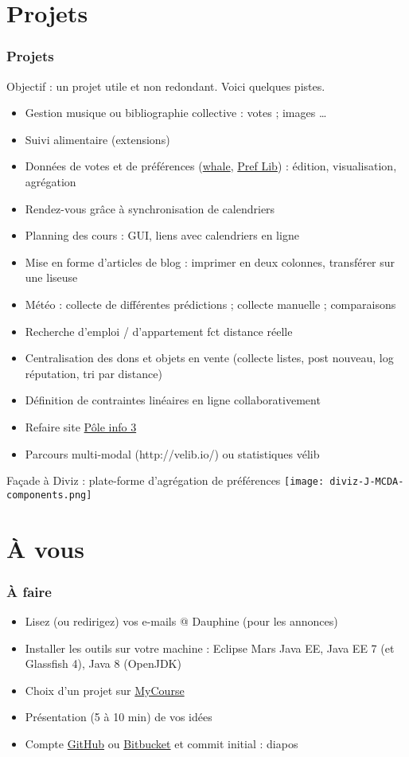 \documentclass[english, french]{beamer}
\begin{document}
\section{Projets}
\begin{frame}[allowframebreaks]
	\frametitle{Projets}
	Objectif : un projet utile et non redondant. Voici quelques pistes.
	\begin{itemize}
		\item Gestion musique ou bibliographie collective : votes ; images …
		\item Suivi alimentaire (extensions)
		\item Données de votes et de préférences ({\href{http://whale3.noiraudes.net/whale3/index.do}{whale}, \href{http://www.preflib.org/}{Pref Lib}}) : édition, visualisation, agrégation
		\item Rendez-vous grâce à synchronisation de calendriers
		\item Planning des cours : GUI, liens avec calendriers en ligne
		\item Mise en forme d’articles de blog : imprimer en deux colonnes, transférer sur une liseuse
		\item Météo : collecte de différentes prédictions ; collecte manuelle ; comparaisons
		\item Recherche d’emploi / d’appartement fct distance réelle
		\item Centralisation des dons et objets en vente (collecte listes, post nouveau, log réputation, tri par distance)
		\item Définition de contraintes linéaires en ligne collaborativement
		\item Refaire site \href{http://www.poleinfo3.dauphine.fr/}{Pôle info 3}
		\item Parcours multi-modal (http://velib.io/) ou statistiques vélib
	\end{itemize}
	Façade à Diviz : plate-forme d’agrégation de préférences
	\texttt{[image: diviz-J-MCDA-components.png]}
\end{frame}

\section{À vous}
\begin{frame}
	\frametitle{À faire}
	\begin{itemize}
		\item Lisez (ou redirigez) vos e-mails @ Dauphine (pour les annonces)
		\item Installer les outils sur votre machine : Eclipse Mars Java EE, Java EE 7 (et Glassfish 4), Java 8 (OpenJDK)
		\item Choix d’un projet sur \href{https://mycourse.dauphine.fr/webapps/blackboard/execute/courseMain?course_id=_34753_1}{MyCourse}
		\item Présentation (5 à 10 min) de vos idées
		\item Compte \href{https://github.com/}{GitHub} ou \href{https://bitbucket.org/}{Bitbucket} et commit initial : diapos
	\end{itemize}
\end{frame}
\end{document}
